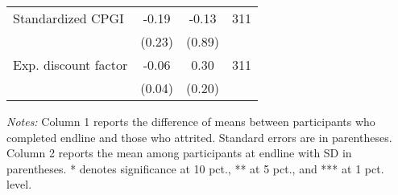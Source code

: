 \begin{table}[h]
{\begin{threeparttable}
\begin{tabular}{l*{3}{c}}
Standardized CPGI&    -0.19&    -0.13&      311\\
          &   (0.23)&   (0.89)&         \\
Exp. discount factor&-0.06\sym{*}&     0.30&      311\\
          &   (0.04)&   (0.20)&         \\
\bottomrule \end{tabular} \begin{tablenotes}[flushleft] \footnotesize \item \emph{Notes:} Column 1 reports the difference of means between participants who completed endline and those who attrited. Standard errors are in parentheses. Column 2 reports the mean among participants at endline with SD in parentheses. * denotes significance at 10 pct., ** at 5 pct., and *** at 1 pct. level. \end{tablenotes} \end{threeparttable} } \end{table}

